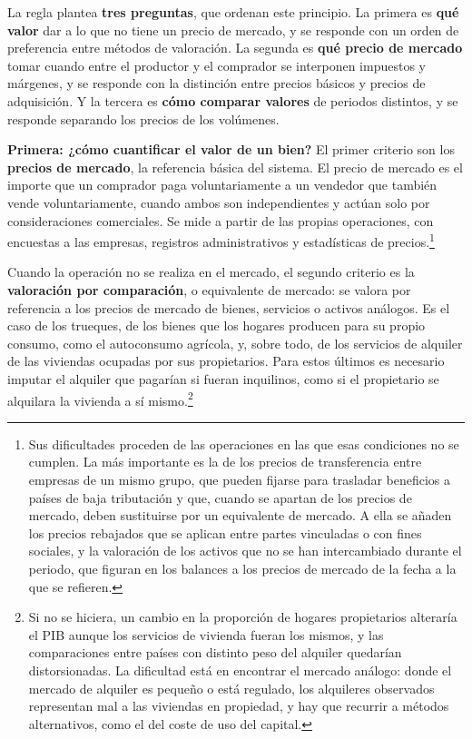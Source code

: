 \documentclass[10pt,a4paper]{article}
\begin{document}
La regla plantea \textbf{tres preguntas}, que ordenan este principio. La primera es \textbf{qué valor} dar a lo que no tiene un precio de mercado, y se responde con un orden de preferencia entre métodos de valoración. La segunda es \textbf{qué precio de mercado} tomar cuando entre el productor y el comprador se interponen impuestos y márgenes, y se responde con la distinción entre precios básicos y precios de adquisición. Y la tercera es \textbf{cómo comparar valores} de periodos distintos, y se responde separando los precios de los volúmenes.

\textbf{Primera: ¿cómo cuantificar el valor de un bien?} El primer criterio son los \textbf{precios de mercado}, la referencia básica del sistema. El precio de mercado es el importe que un comprador paga voluntariamente a un vendedor que también vende voluntariamente, cuando ambos son independientes y actúan solo por consideraciones comerciales. Se mide a partir de las propias operaciones, con encuestas a las empresas, registros administrativos y estadísticas de precios.\footnote{%
  Sus dificultades proceden de las operaciones en las que esas condiciones no se cumplen. La más importante es la de los precios de transferencia entre empresas de un mismo grupo, que pueden fijarse para trasladar beneficios a países de baja tributación y que, cuando se apartan de los precios de mercado, deben sustituirse por un equivalente de mercado. A ella se añaden los precios rebajados que se aplican entre partes vinculadas o con fines sociales, y la valoración de los activos que no se han intercambiado durante el periodo, que figuran en los balances a los precios de mercado de la fecha a la que se refieren.
}

Cuando la operación no se realiza en el mercado, el segundo criterio es la \textbf{valoración por comparación}, o equivalente de mercado: se valora por referencia a los precios de mercado de bienes, servicios o activos análogos. Es el caso de los trueques, de los bienes que los hogares producen para su propio consumo, como el autoconsumo agrícola, y, sobre todo, de los servicios de alquiler de las viviendas ocupadas por sus propietarios. Para estos últimos es necesario imputar el alquiler que pagarían si fueran inquilinos, como si el propietario se alquilara la vivienda a sí mismo.\footnote{%
  Si no se hiciera, un cambio en la proporción de hogares propietarios alteraría el PIB aunque los servicios de vivienda fueran los mismos, y las comparaciones entre países con distinto peso del alquiler quedarían distorsionadas. La dificultad está en encontrar el mercado análogo: donde el mercado de alquiler es pequeño o está regulado, los alquileres observados representan mal a las viviendas en propiedad, y hay que recurrir a métodos alternativos, como el del coste de uso del capital.
}
\end{document}
